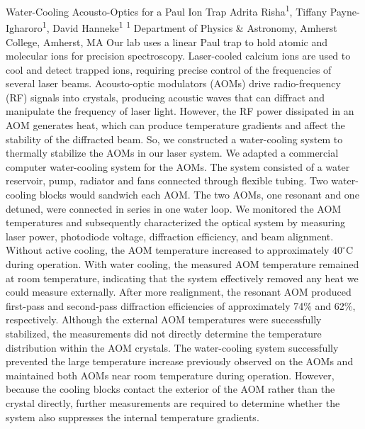 \makeabstract
    {
    Water-Cooling Acousto-Optics for a Paul Ion Trap
    }
    {
    Adrita Risha\textsuperscript{1}, Tiffany Payne-Igharoro\textsuperscript{1}, David Hanneke\textsuperscript{1}
    }
    {
    \textsuperscript{1} Department of Physics \& Astronomy, Amherst College, Amherst, MA
    }
    {
    Our lab uses a linear Paul trap to hold atomic and molecular ions for precision spectroscopy. Laser-cooled calcium ions are used to cool and detect trapped ions, requiring precise control of the frequencies of several laser beams. Acousto-optic modulators (AOMs) drive radio-frequency (RF) signals into crystals, producing acoustic waves that can diffract and manipulate the frequency of laser light. However, the RF power dissipated in an AOM generates heat, which can produce temperature gradients and affect the stability of the diffracted beam. So, we constructed a water-cooling system to thermally stabilize the AOMs in our laser system.
    }
    {
    We adapted a commercial computer water-cooling system for the AOMs. The system consisted of a water reservoir, pump, radiator and fans connected through flexible tubing. Two water-cooling blocks would sandwich each AOM. The two AOMs, one resonant and one detuned, were connected in series in one water loop. We monitored the AOM temperatures and subsequently characterized the optical system by measuring laser power, photodiode voltage, diffraction efficiency, and beam alignment. 
    }
    {
    Without active cooling, the AOM temperature increased to approximately $40^\circ$C during operation. With water cooling, the measured AOM temperature remained at room temperature, indicating that the system effectively removed any heat we could measure externally. After more realignment, the resonant AOM produced first-pass and second-pass diffraction efficiencies of approximately 74\% and 62\%, respectively. Although the external AOM temperatures were successfully stabilized, the measurements did not directly determine the temperature distribution within the AOM crystals. 
    }
    {
    The water-cooling system successfully prevented the large temperature increase previously observed on the AOMs and maintained both AOMs near room temperature during operation. However, because the cooling blocks contact the exterior of the AOM rather than the crystal directly, further measurements are required to determine whether the system also suppresses the internal temperature gradients.
    }

    \newpage
    